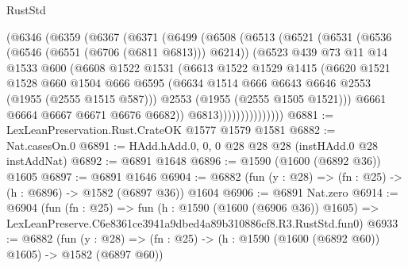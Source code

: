 \begin{lexlean}{RustStd}
\begin{coremodule}
              (@6346
                (@6359
                  (@6367
                    (@6371
                      (@6499
                        (@6508
                          (@6513
                            (@6521
                              (@6531
                                (@6536 (@6546 (@6551 (@6706 (@6811 @6813))) @6214))
                                (@6523
                                  @439
                                  @73
                                  @11
                                  @14
                                  @1533
                                  @600
                                  (@6608
                                    @1522
                                    @1531
                                    (@6613
                                      @1522
                                      @1529
                                      @1415
                                      (@6620
                                        @1521
                                        @1528
                                        @660
                                        @1504
                                        @666
                                        @6595
                                        (@6634
                                          @1514
                                          @666
                                          @6643
                                          @6646
                                          @2553
                                          (@1955 (@2555 @1515 @587)))
                                        @2553
                                        (@1955 (@2555 @1505 @1521)))
                                      @6661
                                      @6664
                                      @6667
                                      @6671
                                      @6676
                                      @6682))
                                  @6813)))))))))))))))
@6881 := LexLeanPreservation.Rust.CrateOK @1577 @1579 @1581
@6882 := Nat.casesOn.{0}
@6891 := HAdd.hAdd.{0, 0, 0} @28 @28 @28 (instHAdd.{0} @28 instAddNat)
@6892 := @6891 @1648
@6896 := @1590 (@1600 (@6892 @36)) @1605
@6897 := @6891 @1646
@6904 := @6882 (fun (y : @28) => (fn : @25) -> (h : @6896) -> @1582 (@6897 @36)) @1604
@6906 := @6891 Nat.zero
@6914 := @6904
    (fun (fn : @25) =>
    fun (h : @1590 (@1600 (@6906 @36)) @1605) =>
    LexLeanPreserve.C6e8361ce3941a9dbed4a89b310886cf8.R3.RustStd.fun0)
@6933 := @6882
    (fun (y : @28) => (fn : @25) -> (h : @1590 (@1600 (@6892 @60)) @1605) -> @1582 (@6897 @60))

\end{coremodule}
\end{lexlean}
